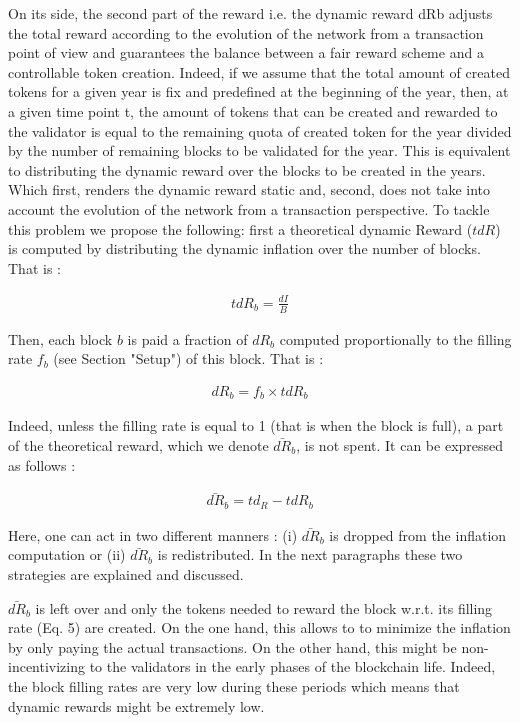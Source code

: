 On its side, the second part of the reward i.e. the dynamic reward dRb adjusts the total reward according to the evolution of the network from a transaction point of view and guarantees the balance between a fair reward scheme and a controllable token creation. Indeed, if we assume that the total amount of created tokens for a given year is fix and predefined at the beginning of the year, then, at a given time point t, the amount of tokens that can be created and rewarded to the validator is equal to the remaining quota of created token for the year divided by the number of remaining blocks to be validated for the year. This is equivalent to distributing the dynamic reward over the blocks to be created in the years. Which first, renders the dynamic reward static and, second, does not take into account the evolution of the network from a transaction perspective. To tackle this problem we propose the following: first a theoretical dynamic Reward ($tdR$) is computed by distributing the dynamic inflation over the number of blocks. That is :
\begin{ceqn}
	\begin{align}
		tdR_b=\frac{dI}{B}
	\end{align}
\end{ceqn}
Then, each block $b$ is paid a fraction of $dR_b$ computed proportionally to the filling rate $f_b$ (see Section "Setup") of this block. That is : 
\begin{ceqn}
	\begin{align}
		dR_b=f_b \times tdR_b
	\end{align}
\end{ceqn}
Indeed, unless the filling rate is equal to 1 (that is when the block is full), a part of the theoretical reward, which we denote $\bar{dR}_b$, is not spent. It can be expressed as follows : 
\begin{ceqn}
	\begin{align}
		\bar{dR}_b=td_R - tdR_b
	\end{align}
\end{ceqn}
Here, one can act in two different manners : (i) $\bar{dR}_b$ is dropped from the inflation computation or (ii) $\bar{dR}_b$ is redistributed. In the next paragraphs these two strategies are explained and discussed.

$\bar{dR}_b$ is left over and only the tokens needed to reward the block w.r.t. its filling rate (Eq. 5) are created. On the one hand, this allows to to minimize the inflation by only paying the actual transactions. On the other hand, this might be non-incentivizing to the validators in the early phases of the blockchain life. Indeed, the block filling rates are very low during these periods which means that dynamic rewards might be extremely low.

